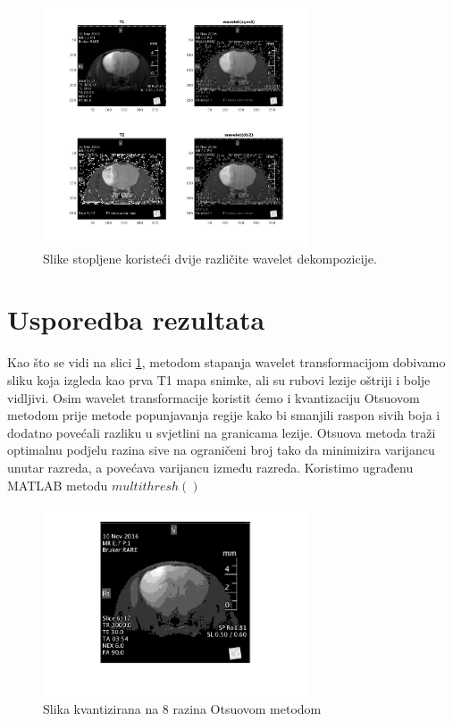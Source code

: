 \documentclass[lmodern, utf8, seminar]{fer}
\begin{document}
\begin{figure}[H]
	\centering
	\includegraphics[width=0.7\textwidth]{waveletfusion}
	\caption{Slike stopljene koristeći dvije različite wavelet dekompozicije.}
	\label{fig:waveletfusion}
\end{figure}

\chapter{Usporedba rezultata}
Kao što se vidi na slici \ref{fig:waveletfusion}, metodom stapanja wavelet transformacijom dobivamo sliku koja izgleda kao prva T1 mapa snimke, ali su rubovi lezije oštriji i bolje vidljivi. 
Osim wavelet transformacije koristit ćemo i kvantizaciju Otsuovom metodom prije metode popunjavanja regije kako bi smanjili raspon sivih boja i dodatno povećali razliku u svjetlini na granicama lezije.
Otsuova metoda traži optimalnu podjelu razina sive na ograničeni broj tako da minimizira varijancu unutar razreda, a povećava varijancu između razreda. Koristimo ugrađenu MATLAB metodu $multithresh()$

\begin{figure}[H]
	\centering
	\includegraphics[width=0.7\textwidth]{thresh}
	\caption{Slika kvantizirana na 8 razina Otsuovom metodom}
	\label{fig:thresh}
\end{figure}
\end{document}
